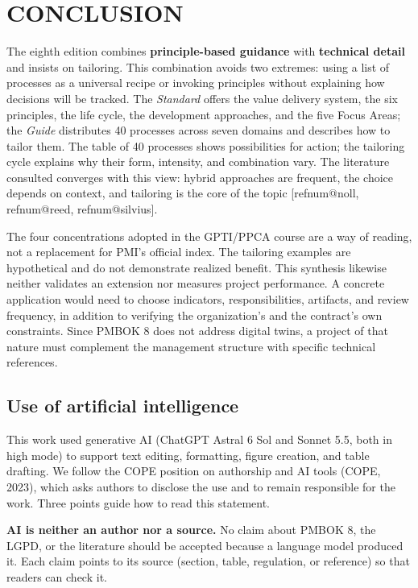 \documentclass[12pt,a4paper,article,oneside,brazil,english]{abntex2}
\makeatletter
\newcommand{\refnum}[1]{\csname refnum@#1\endcsname}
\newif\ifavisofinal  \avisofinaltrue    %
\makeatother
\begin{document}
\section{CONCLUSION}

The eighth edition combines \textbf{principle-based guidance} with \textbf{technical detail} and insists on tailoring. This combination avoids two extremes: using a list of processes as a universal recipe or invoking principles without explaining how decisions will be tracked. The \textit{Standard} offers the value delivery system, the six principles, the life cycle, the development approaches, and the five Focus Areas; the \textit{Guide} distributes 40 processes across seven domains and describes how to tailor them. The table of 40 processes shows possibilities for action; the tailoring cycle explains why their form, intensity, and combination vary. The literature consulted converges with this view: hybrid approaches are frequent, the choice depends on context, and tailoring is the core of the topic [\refnum{noll}, \refnum{reed}, \refnum{silvius}].

The four concentrations adopted in the GPTI/PPCA course are a way of reading, not a replacement for PMI's official index. The tailoring examples are hypothetical and do not demonstrate realized benefit. This synthesis likewise neither validates an extension nor measures project performance. A concrete application would need to choose indicators, responsibilities, artifacts, and review frequency, in addition to verifying the organization's and the contract's own constraints. Since PMBOK 8 does not address digital twins, a project of that nature must complement the management structure with specific technical references.

\ifavisofinal
\subsection{Use of artificial intelligence}

This work used generative AI (ChatGPT Astral 6 Sol and Sonnet 5.5, both in high mode) to support text editing, formatting, figure creation, and table drafting. We follow the COPE position on authorship and AI tools (COPE, 2023), which asks authors to disclose the use and to remain responsible for the work. Three points guide how to read this statement.

\textbf{AI is neither an author nor a source.} No claim about PMBOK 8, the LGPD, or the literature should be accepted because a language model produced it. Each claim points to its source (section, table, regulation, or reference) so that readers can check it.
\end{document}
